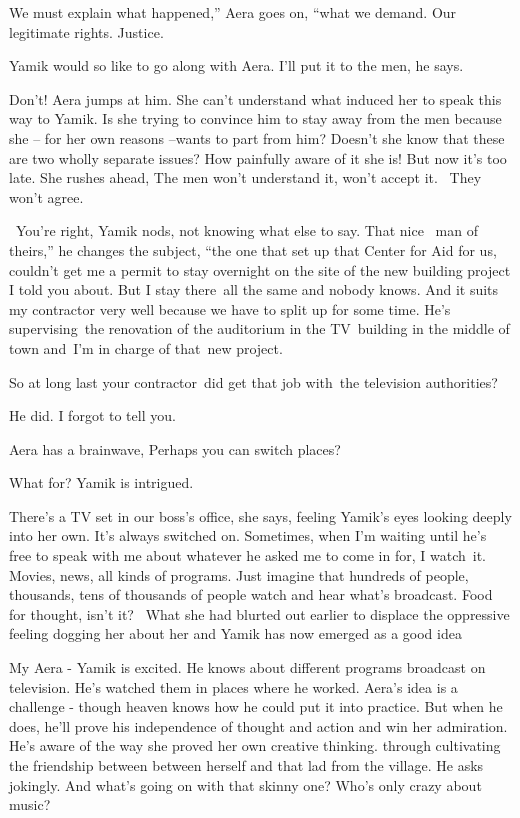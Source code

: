 \documentclass[letterpaper]{article}
\begin{document}
{\textquotedbl}We must explain what happened,'' Aera goes on, ``what we demand. Our legitimate rights.
Justice.{\textquotedbl} 

Yamik would so like to go along with Aera. {\textquotedbl}I'll put it to the men,{\textquotedbl} he says.

{\textquotedbl}Don't!{\textquotedbl} Aera jumps at him. She can't understand what induced her to speak this way to
Yamik. Is she trying to convince him to stay away from the men because she -- for her own reasons --wants to part from
him? Doesn't she know that these are two wholly separate issues? How painfully aware of it she is! But now it's too
late. She rushes ahead, {\textquotedbl}The men won't understand it, won't accept it.~ They won't agree.{\textquotedbl} 

~{\textquotedbl}You're right,{\textquotedbl} Yamik nods, not knowing what else to say. {\textquotedbl}That nice \ man of
theirs,'' he changes the subject, ``the one that set up that Center for Aid for us, couldn't get me a permit to stay
overnight on the site of the new building project I told you about. But I stay there~all the same and nobody knows. And
it suits my contractor very well because we have to split up for some time. He's supervising~the renovation of the
auditorium in the TV~building in the middle of town and~I'm in charge of that~new project.{\textquotedbl} 

{\textquotedbl}So at long last your contractor~did get that job with~the television authorities?{\textquotedbl} 

{\textquotedbl}He did. I forgot to tell you.{\textquotedbl} 

Aera has a brainwave, {\textquotedbl}Perhaps you can switch places?{\textquotedbl} 

{\textquotedbl}What for?{\textquotedbl} Yamik is intrigued.

{\textquotedbl}There's a TV set in our boss's office,{\textquotedbl} she says, feeling Yamik's eyes looking deeply into
her own. {\textquotedbl}It's always switched on. Sometimes, when I'm waiting until he's free to speak with me about
whatever he asked me to come in for, I watch~it. Movies, news, all kinds of programs. Just imagine that hundreds of
people, thousands, tens of thousands of people watch and hear what's broadcast. Food for thought, isn't
it?{\textquotedbl}~ What she had blurted out earlier to displace the oppressive feeling dogging her about her and Yamik
has now emerged as a good idea

{\textquotedbl}My Aera -{\textquotedbl} Yamik is excited. He knows about different programs broadcast on television.
He's watched them in places where he worked. Aera's idea is a challenge -\newline
 though heaven knows how he could put it into practice. But when he does, he'll prove his independence of thought and
action and win her admiration. He's aware of the way she proved her own creative thinking{. }through
cultivating the friendship between between herself and that lad from the village. He asks jokingly. {\textquotedbl}And
what's going on with that skinny one? Who's only crazy about music?{\textquotedbl} 
\end{document}
